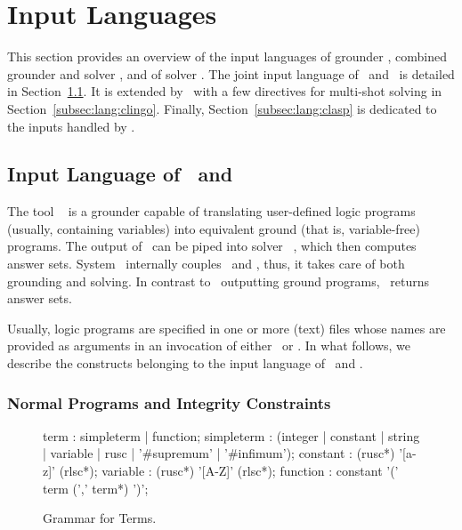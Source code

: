 \section{Input Languages}\label{sec:language}

This section provides an overview of the input languages of
grounder \gringo, combined grounder and solver \clingo, 
and of solver \clasp.
The joint input language of \gringo\ and \clingo\ is detailed in
Section~\ref{subsec:lang:gringo}.
It is extended by \clingo\ with a few directives for multi-shot solving in Section~\ref{subsec:lang:clingo}.
Finally, Section~\ref{subsec:lang:clasp} is dedicated to the inputs handled by \clasp.

\subsection{Input Language of \gringo\ and \clingo}\label{subsec:lang:gringo}

The tool \gringo~\cite{gescth07a} is a grounder capable of translating
user-defined logic programs (usually, containing variables) into 
equivalent ground (that is, variable-free) programs.
The output of \gringo\ can be piped into solver \clasp~\cite{gekanesc07a,gekasc09c},
which then computes answer sets.
System \clingo\ internally couples \gringo\ and \clasp, thus,
it takes care of both grounding and solving.
In contrast to \gringo\ outputting ground programs, 
\clingo\ returns answer sets.

Usually, logic programs are specified in one or more (text) files whose names are
provided as arguments
in an invocation of either \gringo\ or \clingo.
In what follows, we describe the 
constructs belonging to the input language of \gringo\ and \clingo.

\subsubsection{Normal Programs and Integrity Constraints}\label{subsec:gringo:normal}

\begin{figure}
\vspace*{-19mm}
\railnontermfont{\rmfamily\itshape}%
\begin{rail}
	term        : simpleterm | function;
	simpleterm  : (integer | constant | string | variable | rusc | '\#supremum' | '\#infimum');
	constant    : (rusc*) '[a-z]' (rlsc*);
	variable    : (rusc*) '[A-Z]' (rlsc*);
	function    : constant '(' term (',' term*) ')';
\end{rail}
\caption{Grammar for Terms.\label{fig:terms}}
\end{figure}

